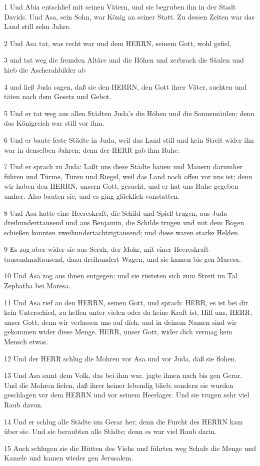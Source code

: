 \par 1 Und Abia entschlief mit seinen Vätern, und sie begruben ihn in der Stadt Davids. Und Asa, sein Sohn, war König an seiner Statt. Zu dessen Zeiten war das Land still zehn Jahre.
\par 2 Und Asa tat, was recht war und dem HERRN, seinem Gott, wohl gefiel,
\par 3 und tat weg die fremden Altäre und die Höhen und zerbrach die Säulen und hieb die Ascherahbilder ab
\par 4 und ließ Juda sagen, daß sie den HERRN, den Gott ihrer Väter, suchten und täten nach dem Gesetz und Gebot.
\par 5 Und er tat weg aus allen Städten Juda's die Höhen und die Sonnensäulen; denn das Königreich war still vor ihm.
\par 6 Und er baute feste Städte in Juda, weil das Land still und kein Streit wider ihn war in denselben Jahren; denn der HERR gab ihm Ruhe.
\par 7 Und er sprach zu Juda: Laßt uns diese Städte bauen und Mauern darumher führen und Türme, Türen und Riegel, weil das Land noch offen vor uns ist; denn wir haben den HERRN, unsern Gott, gesucht, und er hat uns Ruhe gegeben umher. Also bauten sie, und es ging glücklich vonstatten.
\par 8 Und Asa hatte eine Heereskraft, die Schild und Spieß trugen, aus Juda dreihunderttausend und aus Benjamin, die Schilde trugen und mit dem Bogen schießen konnten zweihundertachtzigtausend; und diese waren starke Helden.
\par 9 Es zog aber wider sie aus Serah, der Mohr, mit einer Heereskraft tausendmaltausend, dazu dreihundert Wagen, und sie kamen bis gen Maresa.
\par 10 Und Asa zog aus ihnen entgegen; und sie rüsteten sich zum Streit im Tal Zephatha bei Maresa.
\par 11 Und Asa rief an den HERRN, seinen Gott, und sprach: HERR, es ist bei dir kein Unterschied, zu helfen unter vielen oder da keine Kraft ist. Hilf uns, HERR, unser Gott; denn wir verlassen uns auf dich, und in deinem Namen sind wir gekommen wider diese Menge. HERR, unser Gott, wider dich vermag kein Mensch etwas.
\par 12 Und der HERR schlug die Mohren vor Asa und vor Juda, daß sie flohen.
\par 13 Und Asa samt dem Volk, das bei ihm war, jagte ihnen nach bis gen Gerar. Und die Mohren fielen, daß ihrer keiner lebendig blieb; sondern sie wurden geschlagen vor dem HERRN und vor seinem Heerlager. Und sie trugen sehr viel Raub davon.
\par 14 Und er schlug alle Städte um Gerar her; denn die Furcht des HERRN kam über sie. Und sie beraubten alle Städte; denn es war viel Raub darin.
\par 15 Auch schlugen sie die Hütten des Viehs und führten weg Schafe die Menge und Kamele und kamen wieder gen Jerusalem.

